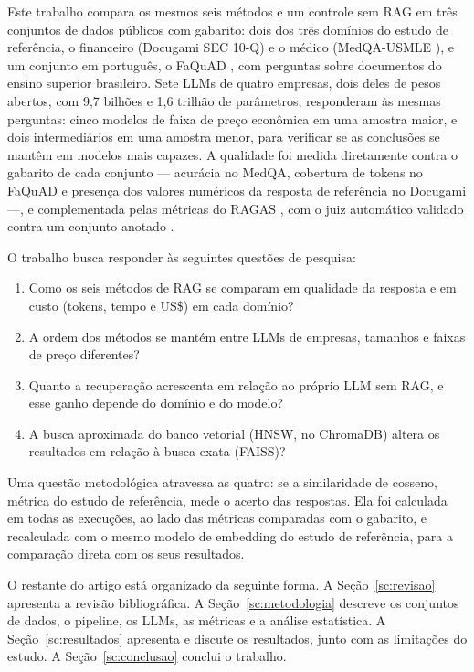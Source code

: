 Este trabalho compara os mesmos seis métodos e um controle sem RAG em três conjuntos de dados públicos com gabarito: dois dos três domínios do estudo de referência, o financeiro (Docugami SEC 10-Q) e o médico (MedQA-USMLE \cite{jin2021medqa}), e um conjunto em português, o FaQuAD \cite{sayama2019faquad}, com perguntas sobre documentos do ensino superior brasileiro. Sete LLMs de quatro empresas, dois deles de pesos abertos, com 9,7 bilhões e 1,6 trilhão de parâmetros, responderam às mesmas perguntas: cinco modelos de faixa de preço econômica em uma amostra maior, e dois intermediários em uma amostra menor, para verificar se as conclusões se mantêm em modelos mais capazes. A qualidade foi medida diretamente contra o gabarito de cada conjunto --- acurácia no MedQA, cobertura de tokens no FaQuAD e presença dos valores numéricos da resposta de referência no Docugami ---, e complementada pelas métricas do RAGAS \cite{es2024ragas}, com o juiz automático validado contra um conjunto anotado \cite{friel2024ragbench}.

O trabalho busca responder às seguintes questões de pesquisa:

\begin{enumerate}
  \item[\textbf{QP1.}] Como os seis métodos de RAG se comparam em qualidade da resposta e em custo (tokens, tempo e US\$) em cada domínio?
  \item[\textbf{QP2.}] A ordem dos métodos se mantém entre LLMs de empresas, tamanhos e faixas de preço diferentes?
  \item[\textbf{QP3.}] Quanto a recuperação acrescenta em relação ao próprio LLM sem RAG, e esse ganho depende do domínio e do modelo?
  \item[\textbf{QP4.}] A busca aproximada do banco vetorial (HNSW, no ChromaDB) altera os resultados em relação à busca exata (FAISS)?
\end{enumerate}

Uma questão metodológica atravessa as quatro: se a similaridade de cosseno, métrica do estudo de referência, mede o acerto das respostas. Ela foi calculada em todas as execuções, ao lado das métricas comparadas com o gabarito, e recalculada com o mesmo modelo de embedding do estudo de referência, para a comparação direta com os seus resultados.

O restante do artigo está organizado da seguinte forma. A Seção~\ref{sc:revisao} apresenta a revisão bibliográfica. A Seção~\ref{sc:metodologia} descreve os conjuntos de dados, o pipeline, os LLMs, as métricas e a análise estatística. A Seção~\ref{sc:resultados} apresenta e discute os resultados, junto com as limitações do estudo. A Seção~\ref{sc:conclusao} conclui o trabalho.
